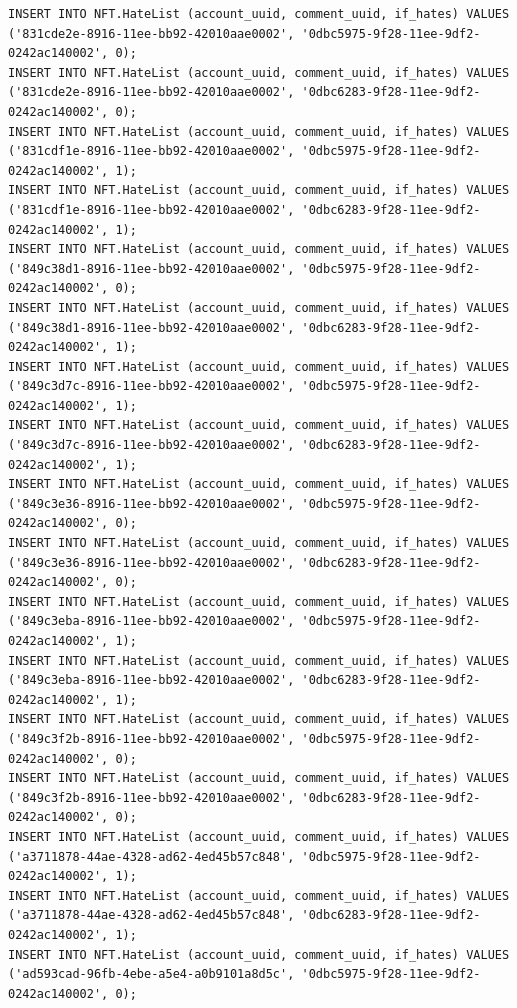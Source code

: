 \documentclass[a4paper, 12pt]{article}
\begin{document}
\begin{lstlisting}
INSERT INTO NFT.HateList (account_uuid, comment_uuid, if_hates) VALUES ('831cde2e-8916-11ee-bb92-42010aae0002', '0dbc5975-9f28-11ee-9df2-0242ac140002', 0);
INSERT INTO NFT.HateList (account_uuid, comment_uuid, if_hates) VALUES ('831cde2e-8916-11ee-bb92-42010aae0002', '0dbc6283-9f28-11ee-9df2-0242ac140002', 0);
INSERT INTO NFT.HateList (account_uuid, comment_uuid, if_hates) VALUES ('831cdf1e-8916-11ee-bb92-42010aae0002', '0dbc5975-9f28-11ee-9df2-0242ac140002', 1);
INSERT INTO NFT.HateList (account_uuid, comment_uuid, if_hates) VALUES ('831cdf1e-8916-11ee-bb92-42010aae0002', '0dbc6283-9f28-11ee-9df2-0242ac140002', 1);
INSERT INTO NFT.HateList (account_uuid, comment_uuid, if_hates) VALUES ('849c38d1-8916-11ee-bb92-42010aae0002', '0dbc5975-9f28-11ee-9df2-0242ac140002', 0);
INSERT INTO NFT.HateList (account_uuid, comment_uuid, if_hates) VALUES ('849c38d1-8916-11ee-bb92-42010aae0002', '0dbc6283-9f28-11ee-9df2-0242ac140002', 1);
INSERT INTO NFT.HateList (account_uuid, comment_uuid, if_hates) VALUES ('849c3d7c-8916-11ee-bb92-42010aae0002', '0dbc5975-9f28-11ee-9df2-0242ac140002', 1);
INSERT INTO NFT.HateList (account_uuid, comment_uuid, if_hates) VALUES ('849c3d7c-8916-11ee-bb92-42010aae0002', '0dbc6283-9f28-11ee-9df2-0242ac140002', 1);
INSERT INTO NFT.HateList (account_uuid, comment_uuid, if_hates) VALUES ('849c3e36-8916-11ee-bb92-42010aae0002', '0dbc5975-9f28-11ee-9df2-0242ac140002', 0);
INSERT INTO NFT.HateList (account_uuid, comment_uuid, if_hates) VALUES ('849c3e36-8916-11ee-bb92-42010aae0002', '0dbc6283-9f28-11ee-9df2-0242ac140002', 0);
INSERT INTO NFT.HateList (account_uuid, comment_uuid, if_hates) VALUES ('849c3eba-8916-11ee-bb92-42010aae0002', '0dbc5975-9f28-11ee-9df2-0242ac140002', 1);
INSERT INTO NFT.HateList (account_uuid, comment_uuid, if_hates) VALUES ('849c3eba-8916-11ee-bb92-42010aae0002', '0dbc6283-9f28-11ee-9df2-0242ac140002', 1);
INSERT INTO NFT.HateList (account_uuid, comment_uuid, if_hates) VALUES ('849c3f2b-8916-11ee-bb92-42010aae0002', '0dbc5975-9f28-11ee-9df2-0242ac140002', 0);
INSERT INTO NFT.HateList (account_uuid, comment_uuid, if_hates) VALUES ('849c3f2b-8916-11ee-bb92-42010aae0002', '0dbc6283-9f28-11ee-9df2-0242ac140002', 0);
INSERT INTO NFT.HateList (account_uuid, comment_uuid, if_hates) VALUES ('a3711878-44ae-4328-ad62-4ed45b57c848', '0dbc5975-9f28-11ee-9df2-0242ac140002', 1);
INSERT INTO NFT.HateList (account_uuid, comment_uuid, if_hates) VALUES ('a3711878-44ae-4328-ad62-4ed45b57c848', '0dbc6283-9f28-11ee-9df2-0242ac140002', 1);
INSERT INTO NFT.HateList (account_uuid, comment_uuid, if_hates) VALUES ('ad593cad-96fb-4ebe-a5e4-a0b9101a8d5c', '0dbc5975-9f28-11ee-9df2-0242ac140002', 0);

\end{lstlisting}
\end{document}
